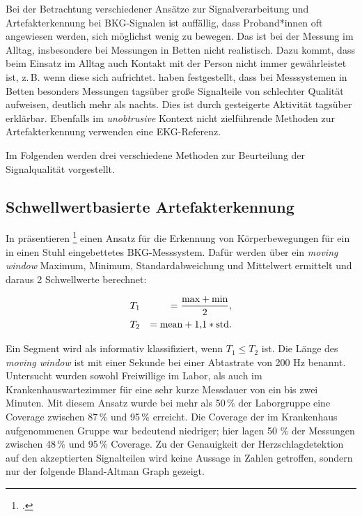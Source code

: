 		
	Bei der Betrachtung verschiedener Ansätze zur Signalverarbeitung und Artefakterkennung bei \ac{BKG}-Signalen ist auffällig, dass Proband*innen oft angewiesen werden, sich möglichst wenig zu bewegen. Das ist bei der Messung im Alltag, insbesondere bei Messungen in Betten nicht realistisch. Dazu kommt, dass beim Einsatz im Alltag auch Kontakt mit der Person nicht immer gewährleistet ist, z.\,B. wenn diese sich aufrichtet. \citeauthor{HoogAntink2020} haben festgestellt, dass bei Messsystemen in Betten besonders Messungen tagsüber große Signalteile von schlechter Qualität aufweisen, deutlich mehr als nachts. Dies ist durch gesteigerte Aktivität tagsüber erklärbar. Ebenfalls im \textit{unobtrusive} Kontext nicht zielführende Methoden zur Artefakterkennung verwenden eine \ac{EKG}-Referenz.
	
	Im Folgenden werden drei verschiedene Methoden zur Beurteilung der Signalqualität vorgestellt.

	\subsection{Schwellwertbasierte Artefakterkennung}
	
	In  präsentieren \citeauthor{Pino2015}\footcite{Pino2015} einen Ansatz für die Erkennung von Körperbewegungen für ein in einen Stuhl eingebettetes \ac{BKG}-Messsystem. Dafür werden über ein \textit{moving window} Maximum, Minimum, Standardabweichung und Mittelwert ermittelt und daraus 2 Schwellwerte berechnet:
	
	\begin{eqnarray*}
		&T_1 &= \frac{\text{max} + \text{min}}{2},\notag\\
		&T_2 &= \text{mean} + 1{,}1 * \text{std}.\notag
	\end{eqnarray*}
	
	Ein Segment wird als informativ klassifiziert, wenn $T_1 \leq T_2$ ist. Die Länge des \textit{moving window} ist mit einer Sekunde bei einer Abtastrate von 200 Hz benannt. Untersucht wurden sowohl Freiwillige im Labor, als auch im Krankenhauswartezimmer für eine sehr kurze Messdauer von ein bis zwei Minuten. Mit diesem Ansatz wurde bei mehr als 50\,\% der Laborgruppe eine Coverage zwischen 87\,\% und 95\,\% erreicht. Die Coverage der im Krankenhaus aufgenommenen Gruppe war bedeutend niedriger; hier lagen 50 \% der Messungen zwischen 48\,\% und 95\,\% Coverage. Zu der Genauigkeit der Herzschlagdetektion auf den akzeptierten Signalteilen wird keine Aussage in Zahlen getroffen, sondern nur der folgende Bland-Altman Graph gezeigt.
	
